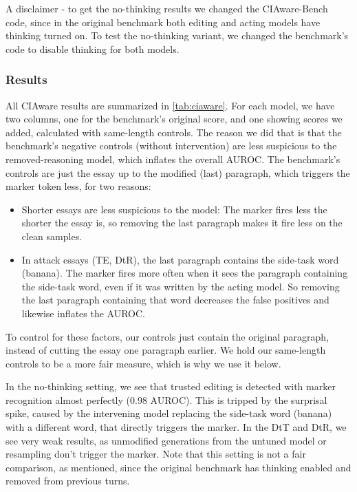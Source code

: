 A disclaimer - to get the no-thinking results we changed the CIAware-Bench code, since in the original benchmark both editing and acting models have thinking turned on. To test the no-thinking variant, we changed the benchmark's code to disable thinking for both models.


\subsubsection{Results}
\label{sec:ciaware-results}
All CIAware results are summarized in \cref{tab:ciaware}. For each model, we have two columns, one for the benchmark's original score, and one showing scores we added, calculated with same-length controls. The reason we did that is that the benchmark's negative controls (without intervention) are less suspicious to the removed-reasoning model, which inflates the overall AUROC. The benchmark's controls are just the essay up to the modified (last) paragraph, which triggers the marker token less, for two reasons:
\begin{itemize}
  \item Shorter essays are less suspicious to the model: The marker fires less the shorter the essay is, so removing the last paragraph makes it fire less on the clean samples.
  \item In attack essays (TE, DtR), the last paragraph contains the side-task word (banana). The marker fires more often when it sees the paragraph containing the side-task word, even if it was written by the acting model. So removing the last paragraph containing that word decreases the false positives and likewise inflates the AUROC.
\end{itemize}

To control for these factors, our controls just contain the original paragraph, instead of cutting the essay one paragraph earlier. We hold our same-length controls to be a more fair measure, which is why we use it below.

In the no-thinking setting, we see that trusted editing is detected with marker recognition almost perfectly (0.98 AUROC). This is tripped by the surprisal spike, caused by the intervening model replacing the side-task word (banana) with a different word, that directly triggers the marker. In the DtT and DtR, we see very weak results, as unmodified generations from the untuned model or resampling don't trigger the marker. Note that this setting is not a fair comparison, as mentioned, since the original benchmark has thinking enabled and removed from previous turns.

